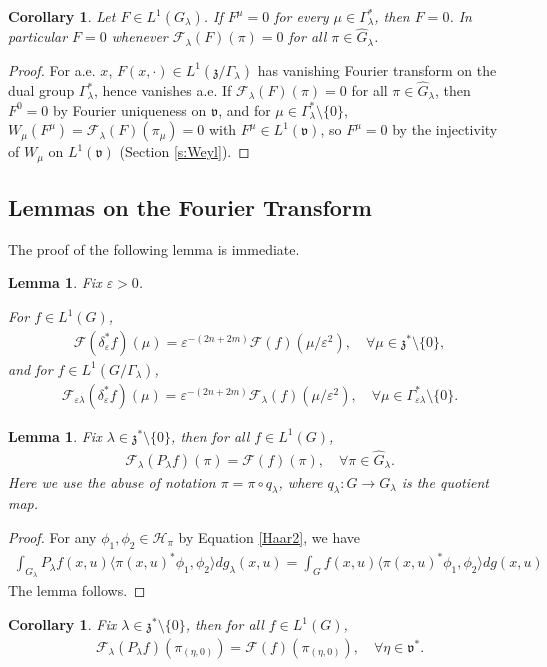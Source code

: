 \documentclass[11pt]{amsart}
\theoremstyle{plain}
\newtheorem{corollary}[theorem]{Corollary}
\newtheorem{lemma}[theorem]{Lemma}
\theoremstyle{definition}
\theoremstyle{remark}
\numberwithin{equation}{section}
\def\fz{\mathfrak{z}}
\def\fv{\mathfrak{v}}
\def\cH{\mathcal{H}}
\def\cF{\mathcal{F}}
\def\mz{\setminus\{0\}}
\def\eps{\varepsilon}
\numberwithin{equation}{section}
\begin{document}
\begin{corollary}\label{c:uniquenessQuotient}
	Let $F\in L^1(G_\lambda)$. If $F^\mu=0$ for every $\mu\in \Gamma_\lambda^*$, then $F=0$. In particular $F=0$ whenever $\cF_\lambda(F)(\pi)=0$ for all $\pi\in \widehat{G}_\lambda$.
\end{corollary}
\begin{proof}
	For a.e. $x$, $F(x, \cdot)\in L^1(\fz/\Gamma_\lambda)$ has vanishing Fourier transform on the dual group $\Gamma_\lambda^*$, hence vanishes a.e. If $\cF_\lambda(F)(\pi)=0$ for all $\pi\in \widehat{G}_\lambda$, then $F^0=0$ by Fourier uniqueness on $\fv$, and for $\mu\in \Gamma_\lambda^*\mz$, $W_\mu(F^\mu)=\cF_\lambda(F)(\pi_\mu)=0$ with $F^\mu\in L^1(\fv)$, so $F^\mu=0$ by the injectivity of $W_\mu$ on $L^1(\fv)$ (Section \ref{s:Weyl}).
\end{proof}


\subsection{Lemmas on the Fourier Transform}
The proof of the following lemma is immediate. 
\begin{lemma}\label{dilationProperty}
	Fix $\eps>0$.

For $f\in L^1(G)$, 
\begin{align*}
	\cF(\delta_\eps^* f)(\mu)=\eps^{-(2n+2m)}\cF(f)(\mu/\eps^2), \quad \forall \mu\in \fz^*\mz,
\end{align*}
and for $f\in L^1(G/\Gamma_\lambda)$, 
\begin{align*}
	\cF_{\eps\lambda}(\delta^*_\eps f)(\mu)=\eps^{-(2n+2m)}\cF_{\lambda}(f)(\mu/\eps^2), \quad \forall \mu\in \Gamma_{\eps\lambda}^*\mz.
\end{align*}
\end{lemma}
\begin{lemma}\label{PoissonSum}
	Fix $\lambda\in \mathfrak{z}^*\setminus\{0\}$, then for all $f\in L^1(G)$,
	\begin{align*}
		\mathcal{F}_\lambda\left(P_\lambda f\right)(\pi)
		=\mathcal{F}(f)(\pi), 
		\quad  \forall \pi\in \widehat{G}_\lambda.
	\end{align*}
	Here we use the abuse of notation $\pi=\pi\circ q_\lambda$, where $q_\lambda: G\to G_\lambda$ is the quotient map. 
\end{lemma}
\begin{proof}
	For any $\phi_1, \phi_2\in \cH_\pi$ by Equation \eqref{Haar2}, we have
	\begin{align*}
		\int_{G_\lambda}P_\lambda f(x, u)\langle \pi(x, u)^*\phi_1, \phi_2\rangle dg_\lambda(x, u)
		=\int_G f(x, u)\langle \pi(x, u)^*\phi_1, \phi_2\rangle dg(x, u)
	\end{align*}
	The lemma follows.
\end{proof}
\begin{corollary}
	Fix $\lambda\in \mathfrak{z}^*\setminus\{0\}$, then for all $f\in L^1(G)$,
	\begin{align*}
		\mathcal{F}_\lambda\left(P_\lambda f\right)(\pi_{(\eta, 0)})
		=\mathcal{F}(f)(\pi_{(\eta, 0)}), 
		\quad  \forall \eta\in \fv^*.
	\end{align*}
\end{corollary}
\end{document}
